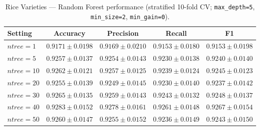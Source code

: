 \documentclass{article}
\begin{document}
\begin{table}[H]
\centering
\small
\caption{Rice Varieties --- Random Forest performance (stratified 10-fold CV; \texttt{max\_depth=5}, \texttt{min\_size=2}, \texttt{min\_gain=0}).}
\label{tab:rice-rf}
\begin{tabular}{@{}lcccc@{}}
\toprule
Setting & Accuracy & Precision & Recall & F1 \\
\midrule
$\mathit{ntree}=1$  & $0.9171 \pm 0.0198$ & $0.9169 \pm 0.0210$ & $0.9153 \pm 0.0180$ & $0.9153 \pm 0.0198$ \\
$\mathit{ntree}=5$  & $0.9257 \pm 0.0137$ & $0.9254 \pm 0.0143$ & $0.9230 \pm 0.0138$ & $0.9240 \pm 0.0140$ \\
$\mathit{ntree}=10$ & $0.9262 \pm 0.0121$ & $0.9257 \pm 0.0125$ & $0.9239 \pm 0.0124$ & $0.9245 \pm 0.0123$ \\
$\mathit{ntree}=20$ & $0.9255 \pm 0.0139$ & $0.9249 \pm 0.0145$ & $0.9230 \pm 0.0140$ & $0.9237 \pm 0.0142$ \\
$\mathit{ntree}=30$ & $0.9265 \pm 0.0135$ & $0.9259 \pm 0.0143$ & $0.9243 \pm 0.0132$ & $0.9248 \pm 0.0137$ \\
$\mathit{ntree}=40$ & $\mathbf{0.9283 \pm 0.0152}$ & $\mathbf{0.9278 \pm 0.0161}$ & $\mathbf{0.9261 \pm 0.0148}$ & $\mathbf{0.9267 \pm 0.0154}$ \\
$\mathit{ntree}=50$ & $0.9260 \pm 0.0147$ & $0.9255 \pm 0.0152$ & $0.9236 \pm 0.0149$ & $0.9243 \pm 0.0150$ \\
\bottomrule
\end{tabular}
\end{table}
\end{document}
